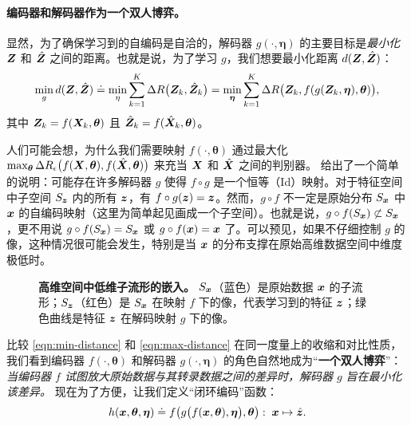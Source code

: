 \documentclass[../../book-main_zh.tex]{subfiles}
\begin{document}
\paragraph{编码器和解码器作为一个双人博弈。}
显然，为了确保学习到的自编码是自洽的，解码器 $g(\cdot, \bm \eta)$ 的主要目标是{\em 最小化} $\bm{Z}$ 和 $\hat {\bm{Z}}$ 之间的距离。也就是说，为了学习 $g$，我们想要最小化距离 $d(\bm{Z}, \hat {\bm{Z}})$：
\begin{equation}
\min_g d(\bm{Z}, \hat {\bm{Z}}) \doteq \min_\eta  \sum_{k=1}^K \Delta R\big(\bm{Z}_k, \hat{\bm{Z}}_k\big) =  \min_{\bm \eta}  \sum_{k=1}^K \Delta R\big(\bm{Z}_k, f(g(\bm{Z}_k, \bm \eta),\bm \theta)\big),
\label{eqn:min-distance}
\end{equation}
其中 $\bm{Z}_k = f(\bm{X}_k,\bm \theta)$ 且 $\hat {\bm{Z}}_k = f(\hat{\bm{X}}_k,\bm\theta)$。

\begin{example}
人们可能会想，为什么我们需要映射 $f(\cdot, \bm \theta)$ 通过最大化 $\max_{\bm \theta} \Delta R_\epsilon\big(f(\bm{X},\bm \theta), f(\hat {\bm{X}}, \bm \theta)\big)$ 来充当 $\bm{X}$ 和 $\hat {\bm{X}}$ 之间的判别器。  给出了一个简单的说明：可能存在许多解码器 $g$ 使得 $f\circ g$ 是一个恒等（Id）映射。对于特征空间中子空间 $S_{\bm{z}}$ 内的所有 $\bm{z}$，有 $f\circ g(\bm{z}) = \bm{z}$。然而，$g\circ f$ 不一定是原始分布 $S_{\bm{x}}$ 中 $\bm{x}$ 的自编码映射（这里为简单起见画成一个子空间）。也就是说，$g\circ f(S_{\bm{x}}) \not\subset S_{\bm{x}}$，更不用说 $g\circ f(S_{\bm{x}}) = S_{\bm{x}}$ 或 $g\circ f(\bm{x}) = \bm{x}$ 了。可以预见，如果不仔细控制 $g$ 的像，这种情况很可能会发生，特别是当 $\bm{x}$ 的分布支撑在原始高维数据空间中维度极低时。
\end{example}
\begin{figure}
\caption{\textbf{高维空间中低维子流形的嵌入。} $S_{\bm{x}}$（蓝色）是原始数据 $\bm{x}$ 的子流形；$S_{\bm{z}}$（红色）是 $S_{\bm{x}}$ 在映射 $f$ 下的像，代表学习到的特征 $\bm{z}$；绿色曲线是特征 $\bm{z}$ 在解码映射 $g$ 下的像。} \label{fig:decoder}
\end{figure} 

比较 \eqref{eqn:min-distance} 和 \eqref{eqn:max-distance} 在同一度量上的收缩和对比性质，我们看到编码器 $f(\cdot, \bm \theta)$ 和解码器 $g(\cdot, \bm \eta)$ 的角色自然地成为“{\bf 一个双人博弈}”：{\em 当编码器 $f$ 试图放大原始数据与其转录数据之间的差异时，解码器 $g$ 旨在最小化该差异。} 现在为了方便，让我们定义“闭环编码”函数：
\begin{equation}
    h(\bm{x}, \bm \theta,\bm \eta) \doteq f\big(g\big(f(\bm{x}, \bm \theta), \bm \eta\big), \bm \theta\big): \; \bm{x} \mapsto \hat {\bm{z}}.
\end{equation}
\end{document}
